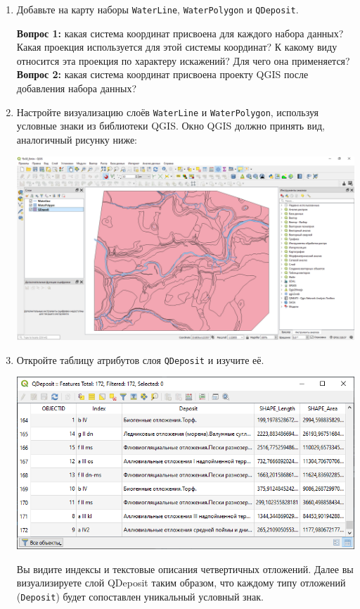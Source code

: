 \documentclass[
  12pt,
]{book}
\begin{document}
\begin{enumerate}
\def\labelenumi{\arabic{enumi}.}
\item
  Добавьте на карту наборы \texttt{WaterLine}, \texttt{WaterPolygon} и \texttt{QDeposit}.

  \textbf{Вопрос 1:} какая система координат присвоена для каждого набора данных? Какая проекция используется для этой системы координат? К какому виду относится эта проекция по характеру искажений? Для чего она применяется?\\
  \textbf{Вопрос 2:} какая система координат присвоена проекту QGIS после добавления набора данных?
\item
  Настройте визуализацию слоёв \texttt{WaterLine} и \texttt{WaterPolygon}, используя условные знаки из библиотеки QGIS. Окно QGIS должно принять вид, аналогичный рисунку ниже:

  \includegraphics{images/Ex02/Example1.png}
\item
  Откройте таблицу атрибутов слоя \texttt{QDeposit} и изучите её.

  \includegraphics{images/Ex02/AttributeTable.png}

  Вы видите индексы и текстовые описания четвертичных отложений. Далее вы визуализируете слой QDeposit таким образом, что каждому типу отложений (\texttt{Deposit}) будет сопоставлен уникальный условный знак.
\end{enumerate}
\end{document}
